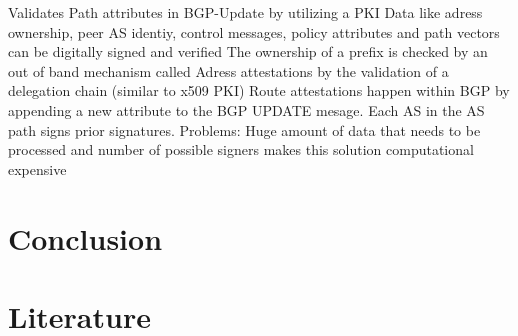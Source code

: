 \documentclass[12pt,a4paper]{IEEEtran}
\begin{document}
			Validates Path attributes in BGP-Update by utilizing a PKI
			Data like adress ownership, peer AS identiy, control messages, policy attributes and path vectors can be digitally signed and verified
			The ownership of a prefix is checked by an out of band mechanism called Adress attestations by the validation of a delegation chain (similar to x509 PKI)
			Route attestations happen within BGP by appending a new attribute to the BGP UPDATE mesage. Each AS in the AS path signs prior signatures.
			Problems: 
				Huge amount of data that needs to be processed and number of possible signers makes this solution computational expensive
				
	\section{Conclusion}				

	
	\section{Literature}
\end{document}
